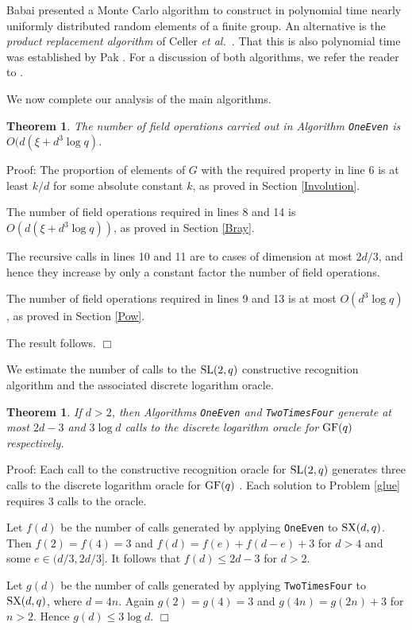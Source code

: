 \documentclass[12pt]{article}
\newtheorem{theorem}[definition]{Theorem}
\newenvironment{proof}{\normalsize {\sc Proof}:}{{\hfill $\Box$ \\}}
\def\SL{{\rm SL}}
\def\GF{{\rm GF}}
\def\SX{{\rm SX}}
\begin{document}
Babai \cite{Babai91} presented a Monte Carlo algorithm to
construct in polynomial time nearly uniformly distributed 
random elements of a finite group.  An alternative is the 
{\it product replacement algorithm} of Celler
{\it et al.\ }\cite{Celleretal95}.
That this is also polynomial time was
established by Pak \cite{Pak00}.
For a discussion of both algorithms, we refer
the reader to \cite[pp.\ 26-30]{Seress03}.

We now complete our analysis of the main algorithms.
\begin{theorem}\label{Theorem1}  
The number of field operations carried out 
in Algorithm {\tt OneEven} is 
$O(d (\xi + d^3 \log q)$. 
\end{theorem}
\begin{proof} 
The proportion of elements of $G$ with the required property in line 6
is at least $k/d$ for some absolute constant $k$, as proved in Section
\ref{Involution}.

The number of field operations required in lines 8 and 14 is 
$O(d(\xi + d^3 \log q))$,
as proved in Section \ref{Bray}.

The recursive calls in  lines 10 and 11 are to cases of dimension at
most $2d/3$, and hence they increase by only a constant factor 
the number of field operations. 

The number of field operations required in lines 9 and 13 is at most 
$O(d^3\log q)$, as proved in Section \ref{Pow}. 

The result follows.
\end{proof}

We estimate the number of calls to the $\SL(2, q)$ constructive
recognition algorithm and the associated discrete logarithm oracle.
\begin{theorem}\label{Theorem2} 
If $d > 2$, then Algorithms {\tt OneEven} and {\tt TwoTimesFour}
generate at most $2d-3$ and $3 \log d$ calls  to 
the discrete logarithm oracle for $\GF(q)$ respectively.
\end{theorem}
\begin{proof}
Each call to the constructive recognition oracle for $\SL(2,q)$ generates 
three calls to the discrete logarithm oracle for $\GF(q)$ \cite{Conderetal05}.
Each solution to Problem \ref{glue} requires 3 calls to the oracle. 

Let $f(d)$ be the number of calls generated by 
applying {\tt OneEven} to $\SX(d, q)$. 
Then $f(2) = f(4) = 3$ and 
$f(d) = f(e) + f(d - e) + 3$ for $d > 4$ and some $e \in (d/3, 2d/3]$.
It follows that $f(d) \leq 2d - 3$ for $d > 2$.

Let $g(d)$ be the number of calls generated by 
applying {\tt TwoTimesFour} to $\SX(d, q)$, where $d = 4n$.
Again $g(2) = g(4) = 3$ and $g(4n) = g(2n) + 3$ for $n > 2$.
Hence $g(d) \leq 3 \log d$.
\end{proof}
\end{document}
